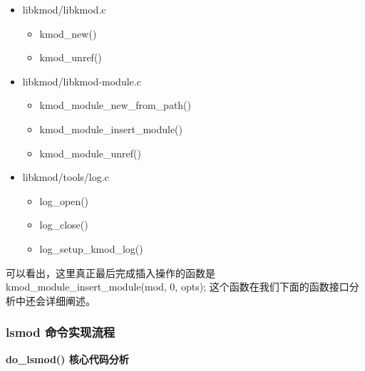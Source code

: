 \documentclass[11pt,a4paper]{article}
\begin{document}
\begin{itemize}
\item
  libkmod/libkmod.c
  \begin{itemize}
  \item
    kmod\_new()
  \item
    kmod\_unref()
  \end{itemize}
\item
  libkmod/libkmod-module.c
  \begin{itemize}
  \item
    kmod\_module\_new\_from\_path()
  \item
    kmod\_module\_insert\_module()
  \item
    kmod\_module\_unref()
  \end{itemize}
\item
  libkmod/tools/log.c
  \begin{itemize}
  \item
    log\_open()
  \item
    log\_close()
  \item
    log\_setup\_kmod\_log()
  \end{itemize}
\end{itemize}
可以看出，这里真正最后完成插入操作的函数是
kmod\_module\_insert\_module(mod, 0, opts);
这个函数在我们下面的函数接口分析中还会详细阐述。

\subsubsection{lsmod 命令实现流程}

\textbf{do\_lsmod() 核心代码分析}
\end{document}
